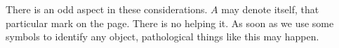 
There is an odd aspect in these considerations.
$A$ may denote itself, that particular mark on the page.
There is no helping it.
As soon as we use some symbols to identify any object, pathological things like this may happen.

%
%
%
%
%
%
%
%
%
%
%
%
%
